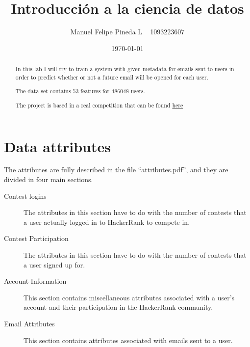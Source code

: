 \documentclass[a4paper]{article}
\title{Introducción a la ciencia de datos}
\author{Manuel Felipe Pineda L ~ 1093223607}
\date{\today}
\begin{document}
\maketitle
\begin{abstract}
  \noindent In this lab I will try to train a system with given
  metadata for emails sent to users in order to predict whether
  or not a future email will be opened for each user.

%

  \noindent The data set contains 53 features for 486048 users.

  \noindent The project is based in a real competition that can be found
  \href{https://www.hackerrank.com/contests/machine-learning-codesprint/challenges/hackerrank-predict-email-opens}{here}

\end{abstract}

\section{Data attributes}

The attributes are fully described in the file ``attributes.pdf'',
and they are divided in four main sections.

\begin{description}
  \item [Contest logins] The attributes in this section have to do
    with the number of contests that a user actually logged in to
    HackerRank to compete in.
  \item [Contest Participation] The attributes in this section have
    to do with the number of contests that a user signed up for.
  \item [Account Information] This section contains miscellaneous
    attributes associated with a user’s account and their
    participation in the HackerRank community.
  \item [Email Attributes] This section contains attributes
    associated with emails sent to a user.
\end{description}
\end{document}
